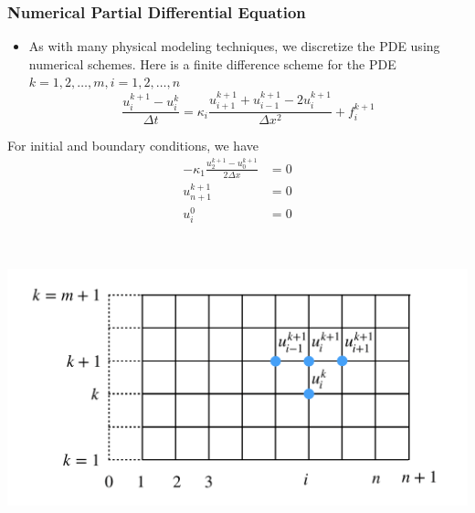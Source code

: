 \documentclass{beamer}
\begin{document}
\begin{frame}
	\frametitle{Numerical Partial Differential Equation}
	
	\begin{itemize}
		\item As with many physical modeling techniques, we discretize the PDE using numerical schemes. Here is a finite difference scheme for the PDE $k=1,2,\ldots,m, i=1,2,\ldots, n$
		$$\frac{u^{k+1}_i-u^k_i}{\Delta t} = \kappa_i \frac{u^{k+1}_{i+1}+u^{k+1}_{i-1}-2u^{k+1}_i}{\Delta x^2} + f_i^{k+1}$$
	\end{itemize}
	\begin{minipage}[c]{0.49\textwidth}
	For initial and boundary conditions, we have
		\begin{align*}
			-\kappa_1 \frac{u_2^{k+1}-u_0^{k+1}}{2\Delta x} &= 0\\
			u_{n+1}^{k+1} &= 0 \\
			u_i^0 &= 0
		\end{align*} 
\end{minipage}~
\begin{minipage}[c]{0.49\textwidth}
  \includegraphics[width=1.0\textwidth]{figures/grid}
\end{minipage}
	
		
\end{frame}
\end{document}
